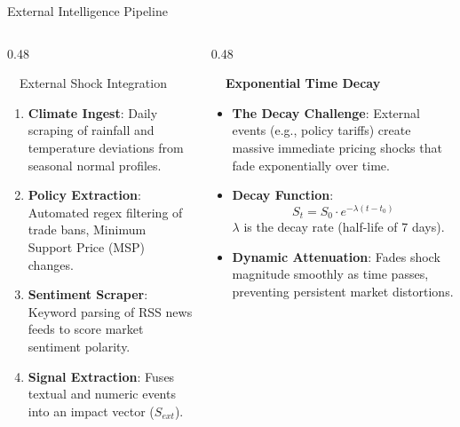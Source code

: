 \documentclass{beamer}
\begin{document}
\begin{frame}{External Intelligence Pipeline}
\vspace{-0.2cm}

\begin{columns}[T]
    \begin{column}{0.48\textwidth}
        \begin{infocard}{~~External Shock Integration}
            \fontsize{6.8pt}{8.5pt}\selectfont
            \begin{enumerate}\setlength\itemsep{3.5pt}\setlength\parskip{0pt}
                \item[\textbf{1.}] \textbf{Climate Ingest}: Daily scraping of rainfall and temperature deviations from seasonal normal profiles.
                \item[\textbf{2.}] \textbf{Policy Extraction}: Automated regex filtering of trade bans, Minimum Support Price (MSP) changes.
                \item[\textbf{3.}] \textbf{Sentiment Scraper}: Keyword parsing of RSS news feeds to score market sentiment polarity.
                \item[\textbf{4.}] \textbf{Signal Extraction}: Fuses textual and numeric events into an impact vector ($S_{ext}$).
            \end{enumerate}
        \end{infocard}
    \end{column}
    
    \begin{column}{0.48\textwidth}
        \begin{smallcard}[0.98\textwidth, top=3pt, bottom=3pt, left=4pt, right=4pt, boxsep=0.5pt]
            \centering \textbf{\textcolor{primaryDark}{\small {}~~Exponential Time Decay}}
            \vspace{0.08cm}
            \fontsize{6.8pt}{8.2pt}\selectfont
            \begin{itemize}\setlength\itemsep{4.5pt}\setlength\parskip{0pt}
                \item \textbf{The Decay Challenge}: External events (e.g., policy tariffs) create massive immediate pricing shocks that fade exponentially over time.
                \item \textbf{Decay Function}:
                \[ S_t = S_0 \cdot e^{-\lambda(t - t_0)} \]
                $\lambda$ is the decay rate (half-life of 7 days).
                \item \textbf{Dynamic Attenuation}: Fades shock magnitude smoothly as time passes, preventing persistent market distortions.
            \end{itemize}
        \end{smallcard}
    \end{column}
\end{columns}


\end{frame}
\end{document}
